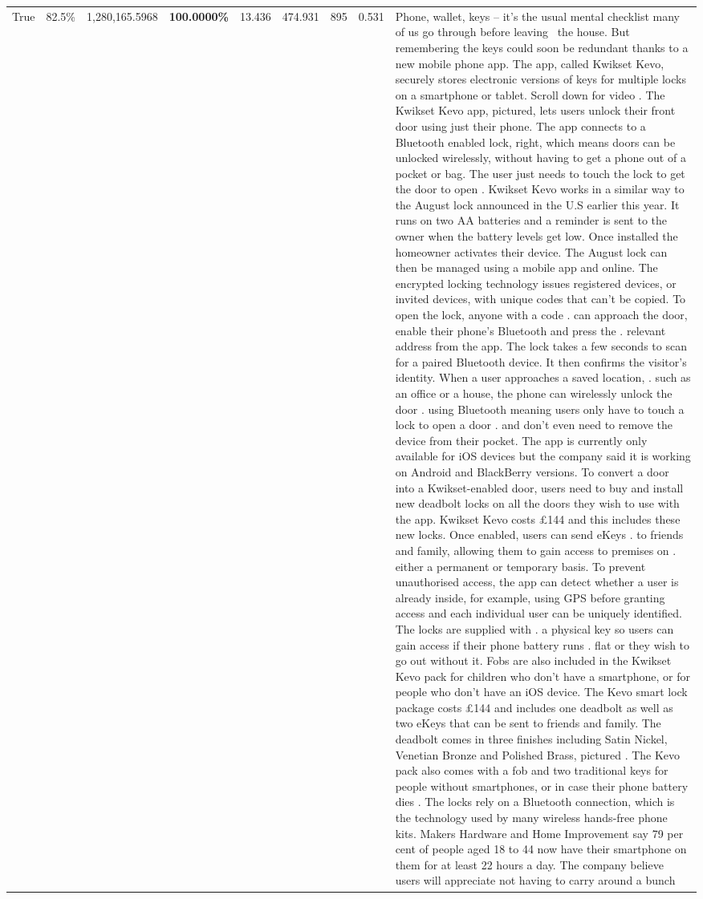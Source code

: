 \begin{table}[H]
\begin{tabular}{lllrlllll}
True & 82.5\% & 1,280,165.5968 & \bfseries \color{red} 100.0000\% & 13.436 & 474.931 & 895 & 0.531 & Phone, wallet, keys – it’s the usual mental checklist many of us go through before leaving  the house. But remembering the keys could soon be redundant thanks to a new mobile phone app. The app, called Kwikset Kevo, securely stores electronic versions of keys for multiple locks on a smartphone or tablet. Scroll down for video . The Kwikset Kevo app, pictured, lets users unlock their front door using just their phone. The app connects to a Bluetooth enabled lock, right, which means doors can be unlocked wirelessly, without having to get a phone out of a pocket or bag. The user just needs to touch the lock to get the door to open . Kwikset Kevo works in a similar way to the August lock announced in the U.S earlier this year. It runs on two AA batteries and a reminder is sent to the owner when the battery levels get low. Once installed the homeowner activates their device. The August lock can then be managed using a mobile app and online. The encrypted locking technology issues registered devices, or invited devices, with unique codes that can't be copied. To open the lock, anyone with a code . can approach the door, enable their phone's Bluetooth and press the . relevant address from the app. The lock takes a few seconds to scan for a paired Bluetooth device. It then confirms the visitor's identity. When a user approaches a saved location, . such as an office or a house, the phone can wirelessly unlock the door . using Bluetooth meaning users only have to touch a lock to open a door . and don't even need to remove the device from their pocket. The app is currently only available for iOS devices but the company said it is working on Android and BlackBerry versions. To convert a door into a Kwikset-enabled door, users need to buy and install new deadbolt locks on all the doors they wish to use with the app. Kwikset Kevo costs £144 and this includes these new locks. Once enabled, users can send eKeys . to friends and family, allowing them to gain access to premises on . either a permanent or temporary basis. To prevent unauthorised access, the app can detect whether a user is already inside, for example, using GPS before granting access and each individual user can be uniquely identified. The locks are supplied with . a physical key so users can gain access if their phone battery runs . flat or they wish to go out without it. Fobs are also included in the Kwikset Kevo pack for children who don't have a smartphone, or for people who don't have an iOS device. The Kevo smart lock package costs £144 and includes one deadbolt as well as two eKeys that can be sent to friends and family. The deadbolt comes in three finishes including Satin Nickel, Venetian Bronze and Polished Brass, pictured . The Kevo pack also comes with a fob and two traditional keys for people without smartphones, or in case their phone battery dies . The locks rely on a Bluetooth connection, which is the technology used by many wireless hands-free phone kits. Makers Hardware and Home Improvement say 79 per cent of people aged 18 to 44 now have their smartphone on them for at least 22 hours a day. The company believe users will appreciate not having to carry around a bunch 
\end{tabular}
\end{table}
